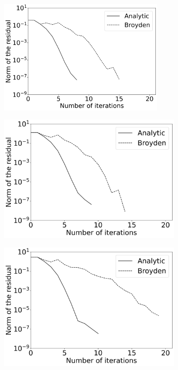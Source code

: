  \begin{figure}[H]
 	\centering
 	\begin{subfigure}{0.32\textwidth}
 		\centering
 		\includegraphics[width=0.9\textwidth]{images/NewtonIterationConvergence5Elements.png}
 	\end{subfigure} 
 	\begin{subfigure}{0.32\textwidth}
 		\centering
 		\includegraphics[width=1\textwidth]{images/NewtonIterationConvergence40Elements.png}
 	\end{subfigure}
 	\begin{subfigure}{0.32\textwidth}
 		\centering
 		\includegraphics[width=1\textwidth]{images/NewtonIterationConvergence200Elements.png}

\end{subfigure}
\end{figure}
